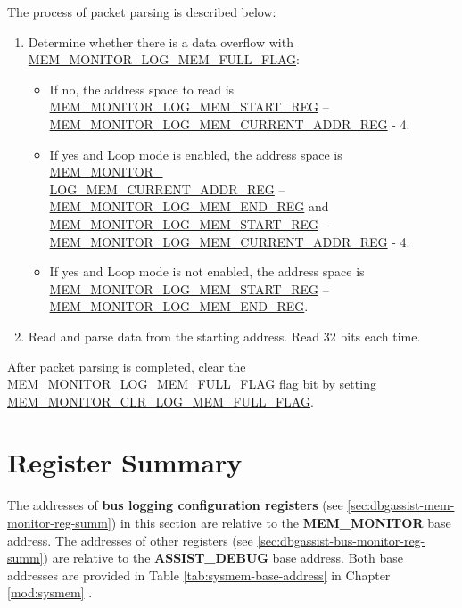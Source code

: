 \documentclass[main\_\_EN.tex]{subfiles}
\begin{document}
The process of packet parsing is described below:

\begin{enumerate}
    \item Determine whether there is a data overflow with \hyperref[fielddesc:MEMMONITORLOGMEMFULLFLAG]{MEM\_MONITOR\_LOG\_MEM\_FULL\_FLAG}:
    \begin{itemize}
        \item If no, the address space to read is \hyperref[regdesc:MEMMONITORLOGMEMSTARTREG]{MEM\_MONITOR\_LOG\_MEM\_START\_REG}  – \hyperref[regdesc:MEMMONITORLOGMEMCURRENTADDRREG]{MEM\_MONITOR\_LOG\_MEM\_CURRENT\_ADDR\_REG} - 4.
        \item If yes and Loop mode is enabled, the address space is \hyperref[regdesc:MEMMONITORLOGMEMCURRENTADDRREG]{MEM\_MONITOR\_\\LOG\_MEM\_CURRENT\_ADDR\_REG} – \hyperref[regdesc:MEMMONITORLOGMEMENDREG]{MEM\_MONITOR\_LOG\_MEM\_END\_REG} and \hyperref[regdesc:MEMMONITORLOGMEMSTARTREG]{MEM\_MONITOR\_LOG\_MEM\_START\_REG}  – \hyperref[regdesc:MEMMONITORLOGMEMCURRENTADDRREG]{MEM\_MONITOR\_LOG\_MEM\_CURRENT\_ADDR\_REG} - 4.
        \item If yes and Loop mode is not enabled, the address space is \hyperref[regdesc:MEMMONITORLOGMEMSTARTREG]{MEM\_MONITOR\_LOG\_MEM\_START\_REG} – \hyperref[regdesc:MEMMONITORLOGMEMENDREG]{MEM\_MONITOR\_LOG\_MEM\_END\_REG}.
    \end{itemize}
    \item Read and parse data from the starting address. Read 32 bits each time.
\end{enumerate}

After packet parsing is completed, clear the \hyperref[fielddesc:MEMMONITORLOGMEMFULLFLAG]{MEM\_MONITOR\_LOG\_MEM\_FULL\_FLAG} flag bit by setting \hyperref[fielddesc:MEMMONITORCLRLOGMEMFULLFLAG]{MEM\_MONITOR\_CLR\_LOG\_MEM\_FULL\_FLAG}.


\hypertarget{dbgassist-reg-summ}{}
\section{Register Summary}
\label{sec:dbgassist-reg-summ}

The addresses of \textbf{bus logging configuration registers} (see \ref{sec:dbgassist-mem-monitor-reg-summ}) in this section are relative to the \textbf{MEM\_MONITOR} base address. The addresses of other registers (see \ref{sec:dbgassist-bus-monitor-reg-summ}) are relative to the \textbf{ASSIST\_DEBUG} base address. Both base addresses are provided in Table \ref{tab:sysmem-base-address} in Chapter \ref{mod:sysmem} \textit{}.
\end{document}
